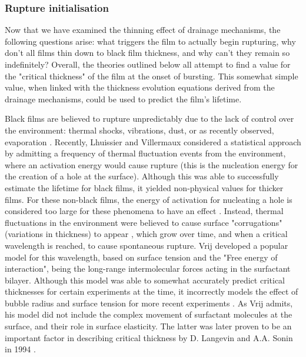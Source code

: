 \documentclass[a4paper,12pt]{article}
\numberwithin{equation}{section}
\numberwithin{figure}{section}
\numberwithin{table}{section}
\begin{document}
\subsubsection{Rupture initialisation}
Now that we have examined the thinning effect of drainage mechanisms, the following questions arise: what triggers the film to actually begin rupturing, why don't all films thin down to black film thickness, and why can't they remain so indefinitely? Overall, the theories outlined below all attempt to find a value for the "critical thickness" of the film at the onset of bursting. This somewhat simple value, when linked with the thickness evolution equations derived from the drainage mechanisms, could be used to predict the film's lifetime.

Black films are believed to rupture unpredictably due to the lack of control over the environment: thermal shocks, vibrations, dust, or as recently observed, evaporation \cite{ChampougnyEvap2018}. Recently, Lhuissier and Villermaux \cite{Lhuissier2011} considered a statistical approach by admitting a frequency of thermal fluctuation events from the environment, where an activation energy would cause rupture (this is the nucleation energy for the creation of a hole at the surface). Although this was able to successfully estimate the lifetime for black films, it yielded non-physical values for thicker films. For these non-black films, the energy of activation for nucleating a hole is considered too large for these phenomena to have an effect \cite{VrijDiscussion1966}. Instead, thermal fluctuations in the environment were believed to cause surface "corrugations" (variations in thickness) to appear \cite{Vrij1968, VrijDiscussion1966}, which grow over time, and when a critical wavelength is reached, to cause spontaneous rupture. Vrij developed a popular model for this wavelength, based on surface tension and the "Free energy of interaction", being the long-range intermolecular forces acting in the surfactant bilayer. Although this model was able to somewhat accurately predict critical thicknesses for certain experiments at the time, it incorrectly models the effect of bubble radius and surface tension for more recent experiments \cite{Langevin1994}. As Vrij admits, his model did not include the complex movement of surfactant molecules at the surface, and their role in surface elasticity. The latter was later proven to be an important factor in describing critical thickness by D. Langevin and A.A. Sonin in 1994 \cite{Langevin1994}.
\end{document}
